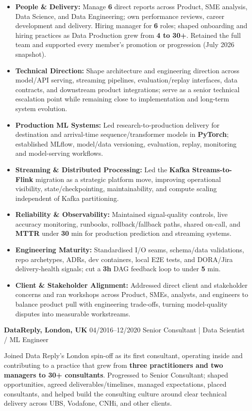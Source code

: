 \documentclass[]{friggeri-cv}
\renewcommand{\entry}[4]{%
  \parbox[t]{\dimexpr\textwidth-\entryleftinset\relax}{%
    \textbf{#2}%
    {\footnotesize\addfontfeature{Color=lightgray}\hspace{0.6em}#1}%
    \hfill%
    {\small\color{textcolor} #3}\\%
    #4\vspace{\parsep}%
  }\\}
\begin{document}
\begin{entrylist}
{{        }
        \begin{itemize}[leftmargin=1.1em]
            \item \footnotesize\textbf{People \& Delivery:} Manage \textbf{6} direct reports across Product, SME analysis, Data Science, and Data Engineering; own performance reviews, career development and delivery. Hiring manager for \textbf{6} roles; shaped onboarding and hiring practices as Data Production grew from \textbf{4 to 30+}. Retained the full team and supported every member's promotion or progression (July 2026 snapshot).
            \item \footnotesize\textbf{Technical Direction:} Shape architecture and engineering direction across model/API serving, streaming pipelines, evaluation/replay interfaces, data contracts, and downstream product integrations; serve as a senior technical escalation point while remaining close to implementation and long-term system evolution.
            \item \footnotesize\textbf{Production ML Systems:} Led research-to-production delivery for destination and arrival-time sequence/transformer models in \textbf{PyTorch}; established MLflow, model/data versioning, evaluation, replay, monitoring and model-serving workflows.
            \item \footnotesize\textbf{Streaming \& Distributed Processing:} Led the \textbf{Kafka Streams-to-Flink} migration as a strategic platform move, improving operational visibility, state/checkpointing, maintainability, and compute scaling independent of Kafka partitioning.
            \item \footnotesize\textbf{Reliability \& Observability:} Maintained signal-quality controls, live accuracy monitoring, runbooks, rollback/fallback paths, shared on-call, and \textbf{MTTR} under \textbf{30} min for production prediction and streaming systems.
            \item \footnotesize\textbf{Engineering Maturity:} Standardised I/O seams, schema/data validations, repo archetypes, ADRs, dev containers, local E2E tests, and DORA/Jira delivery-health signals; cut a \textbf{3h} DAG feedback loop to under \textbf{5} min.
            \item \footnotesize\textbf{Client \& Stakeholder Alignment:} Addressed direct client and stakeholder concerns and ran workshops across Product, SMEs, analysts, and engineers to balance product pull with engineering trade-offs, turning model-quality disputes into measurable workstreams.
        \end{itemize}
    }
    \entry
    {04/2016--12/2020}
    {DataReply, London, UK}
    {Senior Consultant | Data Scientist / ML Engineer}
    {
        {\small
        \setlength{\parindent}{0pt}
        \setlength{\leftskip}{0pt}
        Joined Data Reply's London spin-off as its first consultant, operating inside and contributing to a practice that grew from \textbf{three practitioners and two managers to 30+ consultants}. Progressed to Senior Consultant; shaped opportunities, agreed deliverables/timelines, managed expectations, placed consultants, and helped build the consulting culture around clear technical delivery across UBS, Vodafone, CNHi, and other clients.

}}
\end{entrylist}
\end{document}
